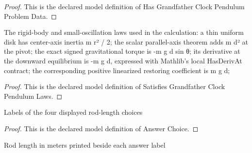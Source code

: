 \begin{proof}
  This is the declared model definition of Has Grandfather Clock Pendulum Problem Data.
\end{proof}
\begin{definition}
  \label{def:physics:phyx-mini-0276:phyxminiproblems-problemphyxmini0276-satisfiesgrandfatherclockpendulumlaws}
  The rigid-body and small-oscillation laws used in the calculation: a thin uniform disk has center-axis inertia m r² / 2; the scalar parallel-axis theorem adds m d² at the pivot; the exact signed gravitational torque is -m g d sin θ; its derivative at the downward equilibrium is -m g d, expressed with Mathlib's local HasDerivAt contract; the corresponding positive linearized restoring coefficient is m g d;
\end{definition}
\begin{proof}
  This is the declared model definition of Satisfies Grandfather Clock Pendulum Laws.
\end{proof}
\begin{definition}
  \label{def:physics:phyx-mini-0276:phyxminiproblems-problemphyxmini0276-answerchoice}
  Labels of the four displayed rod-length choices
\end{definition}
\begin{proof}
  This is the declared model definition of Answer Choice.
\end{proof}
\begin{definition}[meters]
  \label{def:physics:phyx-mini-0276:phyxminiproblems-problemphyxmini0276-answerchoice-meters}
  Rod length in meters printed beside each answer label
\end{definition}
